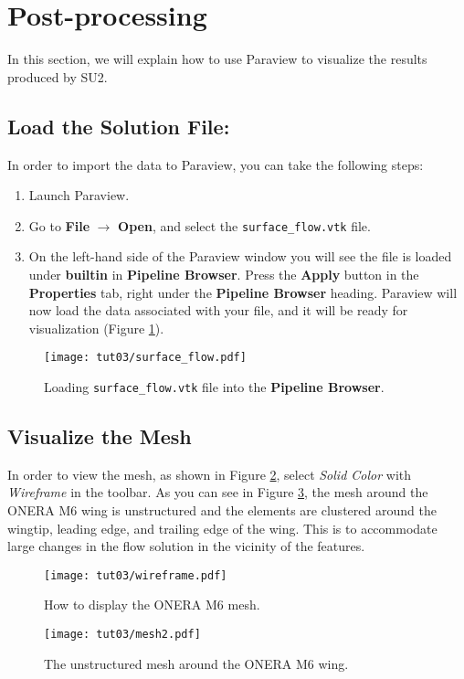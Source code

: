 \section{Post-processing}
In this section, we will explain how to use Paraview to visualize the results produced by SU2.
\subsection{Load the Solution File:}
In order to import the data to Paraview, you can take the following steps:
\begin{enumerate}[label=\arabic*)]
	\item Launch Paraview.
	\item Go to \textbf{File} $\rightarrow$ \textbf{Open}, and select the \texttt{surface\_flow.vtk} file.
	\item On the left-hand side of the Paraview window you will see the file is loaded under \textbf{builtin} in \textbf{Pipeline Browser}. Press the \textbf{Apply} button in the \textbf{Properties} tab, right under the \textbf{Pipeline Browser} heading. Paraview will now load the data associated with your file, and it will be ready for visualization (Figure \ref{fig3:load}).
\end{enumerate}
 
\begin{figure}[ht]
    \centering
    \texttt{[image: tut03/surface\_flow.pdf]}
    \caption{Loading \texttt{surface\_flow.vtk} file into the \textbf{Pipeline Browser}.}
    \label{fig3:load}
\end{figure}
\subsection{Visualize the Mesh}
In order to view the mesh, as shown in Figure \ref{fig3:wireframe}, select \textit{Solid Color} with \textit{Wireframe} in the toolbar. As you can see in Figure \ref{fig3:mesh}, the mesh around the ONERA M6 wing is unstructured and the elements are clustered around the wingtip, leading edge, and trailing edge of the wing. This is to accommodate large changes in the flow solution in the vicinity of the features.
\begin{figure}[ht]
    \centering
    \texttt{[image: tut03/wireframe.pdf]}
    \caption{How to display the ONERA M6 mesh.}
    \label{fig3:wireframe}
\end{figure}
\begin{figure}[ht]
    \centering
    \texttt{[image: tut03/mesh2.pdf]}
    \caption{The unstructured mesh around the ONERA M6 wing.}
    \label{fig3:mesh}
\end{figure}
